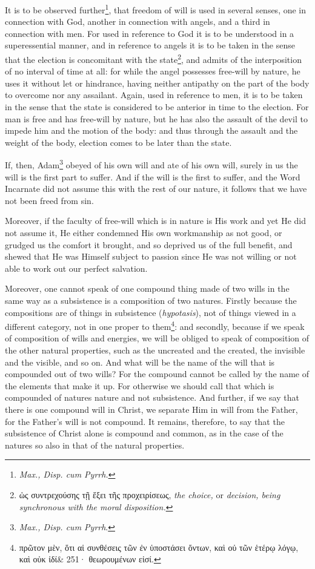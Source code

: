 It is to be observed further\footnote{\emph{Max., Disp. cum Pyrrh.}}, that freedom of will is used in several senses, one in connection with God, another in connection with angels, and a third in connection with men. For used in reference to God it is to be understood in a superessential manner, and in reference to angels it is to be taken in the sense that the election is concomitant with the state\footnote{\textgreek{ὡς συντρεχούσης τῇ ἕξει τῆς προχειρίσεως}, \emph{the choice, }or \emph{decision, being synchronous with the moral disposition.}}, and admits of the interposition of no interval of time at all: for while the angel possesses free-will by nature, he uses it without let or hindrance, having neither antipathy on the part of the body to overcome nor any assailant. Again, used in reference to men, it is to be taken in the sense that the state is considered to be anterior in time to the election. For man is free and has free-will by nature, but he has also the assault of the devil to impede him and the motion of the body: and thus through the assault and the weight of the body, election comes to be later than the state.

If, then, Adam\footnote{\emph{Max., Disp. cum Pyrrh}.} obeyed of his own will and ate of his own will, surely in us the will is the first part to suffer. And if the will is the first to suffer, and the Word Incarnate did not assume this with the rest of our nature, it follows that we have not been freed from sin.

Moreover, if the faculty of free-will which is in nature is His work and yet He did not assume it, He either condemned His own workmanship as not good, or grudged us the comfort it brought, and so deprived us of the full benefit, and shewed that He was Himself subject to passion since He was not willing or not able to work out our perfect salvation.

Moreover, one cannot speak of one compound thing made of two wills in the same way as a subsistence is a composition of two natures. Firstly because the compositions are of things in subsistence (\emph{hypotasis}), not of things viewed in a different category, not in one proper to them\footnote{\textgreek{πρῶτον μὲν, ὅτι αἱ συνθέσεις τῶν ἐν ὑποστάσει ὄντων, καὶ οὐ τῶν ἑτέρῳ λόγῳ, καὶ οὐκ ἰδί\& 251· θεωρουμένων εἰσί}.}: and secondly, because if we speak of composition of wills and energies, we will be obliged to speak of composition of the other natural properties, such as the uncreated and the created, the invisible and the visible, and so on. And what will be the name of the will that is compounded out of two wills? For the compound cannot be called by the name of the elements that make it up. For otherwise we should call that which is compounded of natures nature and not subsistence. And further, if we say that there is one compound will in Christ, we separate Him in will from the Father, for the Father’s will is not compound. It remains, therefore, to say that the subsistence of Christ alone is compound and common, as in the case of the natures so also in that of the natural properties.

